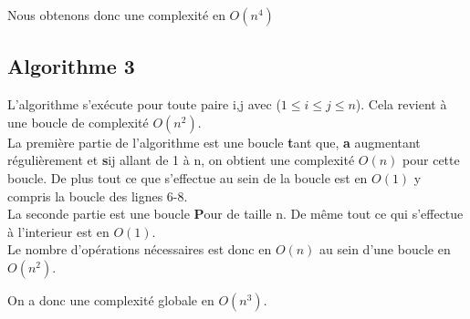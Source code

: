	Nous obtenons donc une complexité en $O(n^4)$
	
	
  \subsection{Algorithme 3}
  
	L'algorithme s'exécute pour toute paire i,j avec ($ 1 \leq i \leq j \leq n$). Cela revient à une boucle de complexité $O(n^2)$.\\

	La première partie de l'algorithme est une boucle {\textbf tant que}, {\textbf a} augmentant régulièrement et {\textbf sij } allant de 1 à n, on obtient une complexité $O(n)$ pour cette boucle. De plus tout ce que s'effectue au sein de la boucle est en $O(1)$ y compris la boucle des lignes 6-8.\\

	La seconde partie est une boucle {\textbf Pour } de taille n. De même tout ce qui s'effectue à l'interieur est en $O(1)$.\\
	
	Le nombre d'opérations nécessaires est donc en $O(n)$ au sein d'une boucle en $O(n^2)$.
	
	On a donc une complexité globale en $O(n^3)$.
	